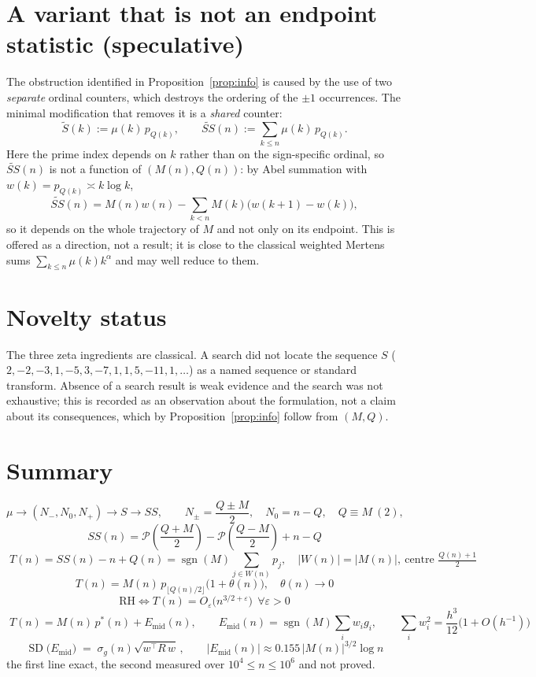 \documentclass[11pt]{amsart}
\theoremstyle{definition}
\newcommand{\mob}{\mu}
\newcommand{\Mert}{M}
\newcommand{\Sq}{Q}
\newcommand{\PS}{\mathcal P}
\begin{document}
\section{A variant that is not an endpoint statistic (speculative)}

The obstruction identified in Proposition~\ref{prop:info} is caused by the use
of two \emph{separate} ordinal counters, which destroys the ordering of the
$\pm1$ occurrences. The minimal modification that removes it is a
\emph{shared} counter:
\[
\widetilde S(k):=\mob(k)\,p_{\Sq(k)},
\qquad
\widetilde{SS}(n):=\sum_{k\le n}\mob(k)\,p_{\Sq(k)} .
\]
Here the prime index depends on $k$ rather than on the sign-specific ordinal, so
$\widetilde{SS}(n)$ is not a function of $(\Mert(n),\Sq(n))$: by Abel summation
with $w(k)=p_{\Sq(k)}\asymp k\log k$,
\[
\widetilde{SS}(n)=\Mert(n)w(n)-\sum_{k<n}\Mert(k)\bigl(w(k+1)-w(k)\bigr),
\]
so it depends on the whole trajectory of $\Mert$ and not only on its endpoint.
This is offered as a direction, not a result; it is close to the classical
weighted Mertens sums $\sum_{k\le n}\mob(k)k^{\alpha}$ and may well reduce to
them.

\section{Novelty status}

The three zeta ingredients are classical. A search did not locate the sequence
$S$ ($2,-2,-3,1,-5,3,-7,1,1,5,-11,1,\dots$) as a named sequence or standard
transform. Absence of a search result is weak evidence and the search was not
exhaustive; this is recorded as an observation about the formulation, not a
claim about its consequences, which by Proposition~\ref{prop:info} follow from
$(\Mert,\Sq)$.

\section{Summary}

\[
\mob \longrightarrow (N_-,N_0,N_+) \longrightarrow S \longrightarrow SS,
\qquad
N_\pm=\frac{\Sq\pm\Mert}2,\quad N_0=n-\Sq,\quad \Sq\equiv\Mert\ (2),
\]
\[
\boxed{\;
SS(n)=\PS\!\left(\frac{\Sq+\Mert}2\right)-\PS\!\left(\frac{\Sq-\Mert}2\right)+n-\Sq \;}
\]
\[
\boxed{\;T(n)=SS(n)-n+\Sq(n)=\operatorname{sgn}(\Mert)\!\!\sum_{j\in W(n)}\!\!p_j,
\quad |W(n)|=|\Mert(n)|,\ \text{centre } \tfrac{\Sq(n)+1}2 \;}
\]
\[
\boxed{\;T(n)=\Mert(n)\,p_{\lfloor \Sq(n)/2\rfloor}\bigl(1+\theta(n)\bigr),\quad \theta(n)\to0\;}
\]
\[
\boxed{\;\mathrm{RH}\iff T(n)=O_\varepsilon\bigl(n^{3/2+\varepsilon}\bigr)\ \ \forall\varepsilon>0\;}
\]
\[
\boxed{\;T(n)=\Mert(n)\,p^{*}(n)+E_{\mathrm{mid}}(n),
\qquad
E_{\mathrm{mid}}(n)=\operatorname{sgn}(\Mert)\sum_i w_i g_i,
\qquad
\sum_i w_i^2=\frac{h^3}{12}\bigl(1+O(h^{-1})\bigr)\;}
\]
\[
\boxed{\;\operatorname{SD}\bigl(E_{\mathrm{mid}}\bigr)\;=\;\sigma_g(n)\sqrt{w^{\!\top}\!R\,w}\,,
\qquad
|E_{\mathrm{mid}}(n)|\approx0.155\,|\Mert(n)|^{3/2}\log n\;}
\]
the first line exact, the second measured over $10^{4}\le n\le10^{6}$ and not proved.
\end{document}
